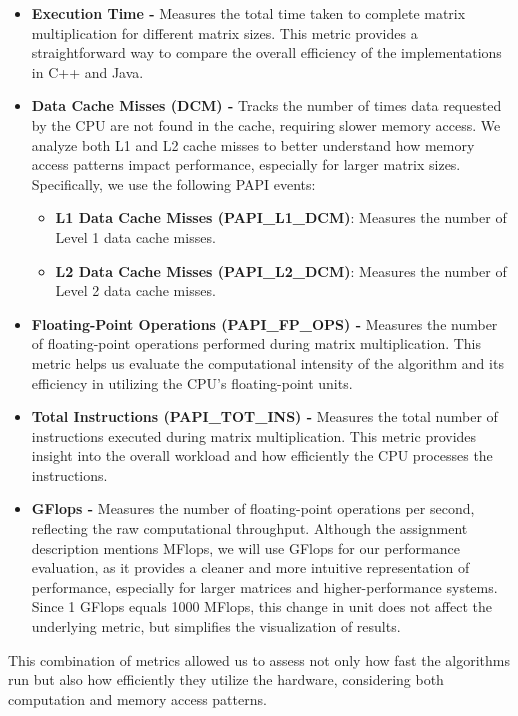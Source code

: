 \documentclass{article}
\begin{document}
\begin{itemize}
    \item \textbf{Execution Time - } Measures the total time taken to complete matrix multiplication for different matrix sizes. This metric provides a straightforward way to compare the overall efficiency of the implementations in C++ and Java.
    
    \item \textbf{Data Cache Misses (DCM) - } Tracks the number of times data requested by the CPU are not found in the cache, requiring slower memory access. We analyze both L1 and L2 cache misses to better understand how memory access patterns impact performance, especially for larger matrix sizes. Specifically, we use the following PAPI events:
    \begin{itemize}
        \item \textbf{L1 Data Cache Misses (PAPI\_L1\_DCM)}: Measures the number of Level 1 data cache misses.
        \item \textbf{L2 Data Cache Misses (PAPI\_L2\_DCM)}: Measures the number of Level 2 data cache misses.
    \end{itemize}

    \item \textbf{Floating-Point Operations (PAPI\_FP\_OPS) - } Measures the number of floating-point operations performed during matrix multiplication. This metric helps us evaluate the computational intensity of the algorithm and its efficiency in utilizing the CPU's floating-point units.

    \item \textbf{Total Instructions (PAPI\_TOT\_INS) - } Measures the total number of instructions executed during matrix multiplication. This metric provides insight into the overall workload and how efficiently the CPU processes the instructions.

    \item \textbf{GFlops - } Measures the number of floating-point operations per second, reflecting the raw computational throughput. Although the assignment description mentions MFlops, we will use GFlops for our performance evaluation, as it provides a cleaner and more intuitive representation of performance, especially for larger matrices and higher-performance systems. Since 1 GFlops equals 1000 MFlops, this change in unit does not affect the underlying metric, but simplifies the visualization of results.
\end{itemize}

This combination of metrics allowed us to assess not only how fast the algorithms run but also how efficiently they utilize the hardware, considering both computation and memory access patterns.
\end{document}

